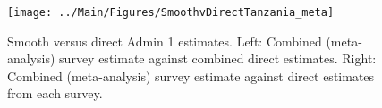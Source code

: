 \documentclass[12pt]{article}\usepackage[]{graphicx}\usepackage[]{color}
\newenvironment{knitrout}{}{} %
\begin{document}



\begin{knitrout}
\color{fgcolor}\begin{figure}[bht]

{\centering \texttt{[image: ../Main/Figures/SmoothvDirectTanzania\_meta]} 

}

\caption[Smooth versus direct Admin 1 estimates]{Smooth versus direct Admin 1 estimates. Left: Combined (meta-analysis) survey estimate against combined direct estimates. Right: Combined (meta-analysis) survey estimate against direct estimates from each survey.}\label{fig:unnamed-chunk-303}
\end{figure}


\end{knitrout}
\end{document}
